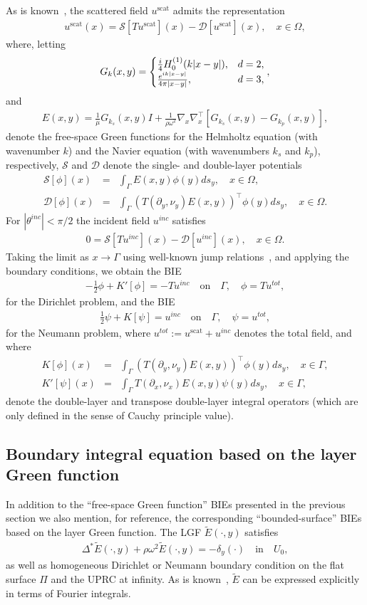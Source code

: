 \documentclass[10pt]{article}
\numberwithin{equation}{section}
\newcommand{\be}{\begin{eqnarray}}
\newcommand{\ben}{\begin{eqnarray*}}
\newcommand{\en}{\end{eqnarray}}
\newcommand{\enn}{\end{eqnarray*}}
\newcommand{\pa}{\partial}
\newtheorem{remark}[theorem]{Remark}
\begin{document}
As is known~\cite{CGK02}, the scattered field $u^\mathrm{scat}$ admits the representation
\be
\label{scawaverepre}
u^\mathrm{scat}(x)= \mathcal{S}[Tu^\mathrm{scat}](x)-\mathcal{D}[u^\mathrm{scat}](x),\quad x\in\Omega,
\en
where, letting
\ben
G_{k}(x,y)=\begin{cases}
\frac{i}{4}H_0^{(1)}(k|x-y|), & d=2,\cr
\frac{e^{ik|x-y|}}{4\pi|x-y|}, & d=3,
\end{cases}, \enn and \ben
E(x,y)=\frac{1}{\mu}G_{k_s}(x,y)I+\frac{1}{\rho\omega^2}
\nabla_x\nabla_x^\top \left[G_{k_s}(x,y)-G_{k_p}(x,y)\right], \enn
denote the free-space Green functions for the Helmholtz equation (with
wavenumber $k$) and the Navier equation (with wavenumbers $k_s$ and
$k_p$), respectively, $\mathcal{S}$ and $\mathcal{D}$ denote the
single- and double-layer potentials \be
\label{singlelayer}
\mathcal{S}[\phi](x)&=&\int_\Gamma E(x,y)\phi(y)ds_y,\quad x\in\Omega,\\
\label{doublelayer}
\mathcal{D}[\phi](x)&=&\int_\Gamma
(T(\pa_y,\nu_y)E(x,y))^\top\phi(y)ds_y,\quad x\in\Omega. \en For
$|\theta^{inc}|<\pi/2$ the incident field $u^{inc}$ satisfies \be
\label{incwaverepre}
0=\mathcal{S}[Tu^{inc}](x)-\mathcal{D}[u^{inc}](x),\quad x\in\Omega.
\en
Taking the limit as $x\rightarrow\Gamma$ using well-known jump relations~\cite{HW08}, and applying the boundary conditions, we  obtain the BIE
\be
\label{DBIE}
-\frac{1}{2}\phi+K'[\phi]=-Tu^{inc} \quad\mbox{on}\quad\Gamma, \quad \phi=Tu^{tot},
\en
for the Dirichlet problem, and the BIE
\be
\label{NBIE}
\frac{1}{2}\psi+K[\psi]=u^{inc} \quad\mbox{on}\quad\Gamma, \quad
\psi=u^{tot}, \en for the Neumann problem, where
$u^{tot}:=u^\mathrm{scat}+u^{inc}$ denotes the total field, and where \be
\label{dlo}
K[\phi](x)&=&\int_\Gamma (T(\pa_y,\nu_y)E(x,y))^\top\phi(y)ds_y,\quad x\in\Gamma,\\
\label{tdlo}
K'[\psi](x)&=&\int_\Gamma T(\pa_x,\nu_x)E(x,y)\psi(y)ds_y,\quad
x\in\Gamma, \en denote the double-layer and transpose double-layer
integral operators (which are only defined in the sense of Cauchy
principle value).

\subsection{Boundary integral equation based on the layer Green function}
\label{sec:2.3}

In addition to the ``free-space Green function'' BIEs presented in the
previous section we also mention, for reference, the corresponding
``bounded-surface'' BIEs based on the layer Green function.  The LGF
$\widetilde{E}(\cdot,y)$ satisfies \ben \Delta^*
\widetilde{E}(\cdot,y)+\rho\omega^2\widetilde{E}(\cdot,y)
=-\delta_y(\cdot) \quad\mbox{in}\quad U_0, \enn as well as homogeneous
Dirichlet or Neumann boundary condition on the flat surface $\Pi$ and
the UPRC at infinity. As is known~\cite{A00,CB14,DGN10,DMN11},
$\widetilde{E}$ can be expressed explicitly in terms of Fourier
integrals.
\end{document}
